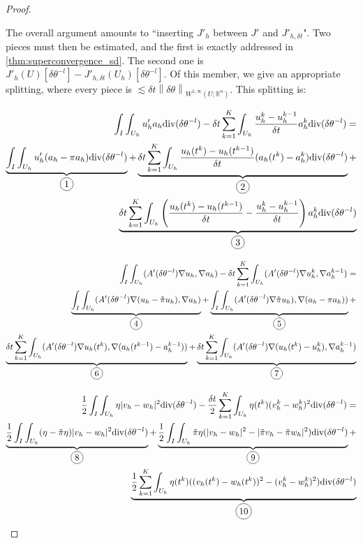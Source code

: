\documentclass[english,a4paper,10pt,oneside]{scrbook}	%
\theoremstyle{break}
\newenvironment{mproof}[1][\proofname]{%
  \begin{proof}[#1]$ $\par\nobreak\ignorespaces
}{%
  \end{proof}
}
\renewcommand*{\proofname}{Proof}
\theoremstyle{remark}
\newcommand{\mR}{\mathbb{R}}
\newcommand{\ds}{\displaystyle}
\newcommand{\norm}[1]{\left\lVert#1\right\rVert}
\newcommand{\te}{\theta}
\newcommand{\dive}{\text{div}}
\newcommand*\circled[1]{\tikz[baseline=(char.base)]{
            \node[shape=circle,draw,inner sep=2pt] (char) {#1};}}
\begin{document}
\begin{mproof}
The overall argument amounts to ``inserting $J'_h$ between $J'$ and $J'_{h,\delta t}$". Two pieces must then be estimated, and the first is exactly addressed in \cref{thm:superconvergence_sd}.
The second one is $\ds J'_h(U)[\delta \te^{-l}] - J'_{h,\delta t}(U_h)[\delta \te^{-l}]$. Of this member, we give an appropriate splitting, where every piece is $\lesssim \delta t\norm{\delta \te}_{W^{1,\infty}(U;\mR^n)}$. This splitting is:

\begin{align*}
	\int_I\int_{U_h}u_h'a_h\dive(\delta \te^{-l})-\delta t \sum_{k=1}^K \int_{U_h} \frac{u_h^k-u_h^{k-1}}{\delta t}a_h^k \dive(\delta \te^{-l})  =\\
	\underbrace{\int_I\int_{U_h}u_h'(a_h-\pi a_h)\dive(\delta \te^{-l})}_{\circled{1}}+
	\underbrace{\delta t \sum_{k=1}^K\int_{U_h}\frac{u_h(t^k)-u_h(t^{k-1})}{\delta t}(a_h(t^k)-a_h^k)\dive(\delta \te^{-l})}_{\circled{2}}+\\
	\underbrace{\delta t \sum_{k=1}^K \int_{U_h} \left (\frac{u_h(t^k)-u_h(t^{k-1})}{\delta t}-\frac{u_h^k-u_h^{k-1}}{\delta t}\right )a_h^k \dive(\delta \te^{-l})}_{\circled{3}}
\end{align*}


\begin{align*}
	\int_I \int_{U_h} (A'(\delta \te^{-l})\nabla u_h,\nabla a_h) - \delta t \sum_{k=1}^K \int_{U_h} (A'(\delta \te^{-l})\nabla u_h^k,\nabla a_h^{k-1}) =  \\
	\underbrace{\int_I \int_{U_h} (A'(\delta \te^{-l})\nabla (u_h-\tilde{\pi} u_h),\nabla a_h) }_{\circled{4}}+ 
	\underbrace{\int_I \int_{U_h} (A'(\delta \te^{-l})\nabla \tilde{\pi} u_h ) ,\nabla (a_h - \pi a_h))}_{\circled{5}} +\\
	\underbrace{\delta t \sum_{k=1}^K \int_{U_h} (A'(\delta \te^{-l})\nabla u_h(t^k) , \nabla( a_h(t^{k-1})-a_h^{k-1}))}_{\circled{6}} +
	\underbrace{\delta t \sum_{k=1}^K \int_{U_h} (A'(\delta \te^{-l})\nabla (u_h(t^k)-u_h^k ) ,\nabla a_h^{k-1})}_{\circled{7}}
\end{align*}

\begin{align*}
	\frac{1}{2} \int_I \int_{U_h} \eta |v_h-w_h|^2\dive(\delta \te^{-l}) - \frac{\delta t}{2} \sum_{k=1}^K \int_{U_h}\eta(t^k)(v_h^k-w_h^k)^2\dive(\delta \te^{-l}) = \\
	\underbrace{\frac{1}{2} \int_I \int_{U_h} (\eta-\tilde{\pi}\eta) |v_h-w_h|^2\dive(\delta \te^{-l})}_{\circled{8}}+
	\underbrace{\frac{1}{2} \int_I \int_{U_h} \tilde{\pi} \eta (|v_h-w_h|^2 - |\tilde{\pi} v_h-\tilde{\pi}w_h|^2)\dive(\delta \te^{-l})}_{\circled{9}}+\\
	\underbrace{\frac{1}{2} \sum_{k=1}^K \int_{U_h}\eta(t^k)((v_h(t^k)-w_h(t^k))^2-(v_h^k-w_h^k)^2)\dive(\delta \te^{-l})}_{\circled{10}}
\end{align*}


\end{mproof}
\end{document}
